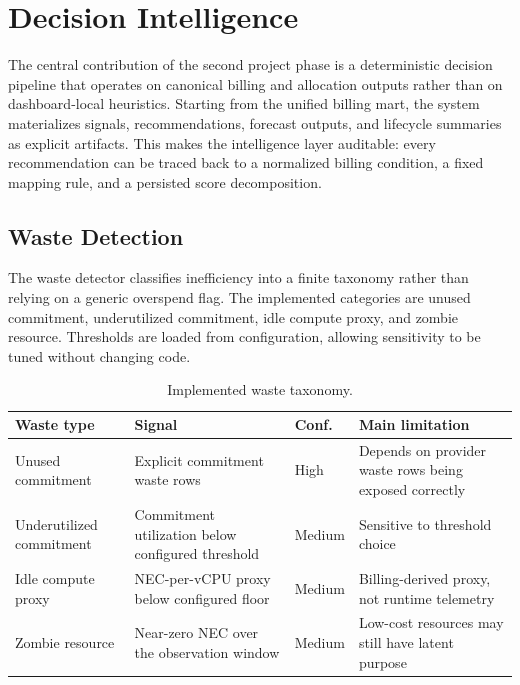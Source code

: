 \section{Decision Intelligence}
\label{sec:intelligence}

The central contribution of the second project phase is a deterministic decision pipeline that operates on canonical billing and allocation outputs rather than on dashboard-local heuristics. Starting from the unified billing mart, the system materializes signals, recommendations, forecast outputs, and lifecycle summaries as explicit artifacts. This makes the intelligence layer auditable: every recommendation can be traced back to a normalized billing condition, a fixed mapping rule, and a persisted score decomposition.

\subsection{Waste Detection}
The waste detector classifies inefficiency into a finite taxonomy rather than relying on a generic overspend flag. The implemented categories are unused commitment, underutilized commitment, idle compute proxy, and zombie resource. Thresholds are loaded from configuration, allowing sensitivity to be tuned without changing code.

\begin{table}[t]
\caption{Implemented waste taxonomy.}
\label{tab:waste-taxonomy}
\centering
\footnotesize
\begin{tabularx}{\columnwidth}{p{} p{} p{} Y}
\toprule
\textbf{Waste type} & \textbf{Signal} & \textbf{Conf.} & \textbf{Main limitation} \\
\midrule
Unused commitment & Explicit commitment waste rows & High & Depends on provider waste rows being exposed correctly \\
Underutilized commitment & Commitment utilization below configured threshold & Medium & Sensitive to threshold choice \\
Idle compute proxy & NEC-per-vCPU proxy below configured floor & Medium & Billing-derived proxy, not runtime telemetry \\
Zombie resource & Near-zero NEC over the observation window & Medium & Low-cost resources may still have latent purpose \\
\bottomrule
\end{tabularx}
\end{table}

